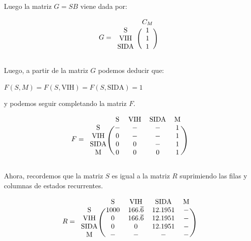\documentclass[11pt]{article}
\begin{document}
Luego la matriz $ G = SB $ viene dada por: 

\begin{equation*}
  G = 
  \begin{blockarray}{cc}
     & C_M \\
    \begin{block}{c(c)}
      \text{S}    & 1 \\
      \text{VIH}  & 1 \\
      \text{SIDA} & 1  \\
    \end{block}
  \end{blockarray}
\end{equation*}

Luego, a partir de la matriz $G$ podemos deducir que:

$ F(S, M) = F(S, \text{VIH}) = F(S, \text{SIDA}) = 1 $

y podemos seguir completando la matriz $F$.

\begin{equation*}
  F = 
  \begin{blockarray}{ccccc}
     & \text{S} & \text{VIH} & \text{SIDA} & \text{M} \\
    \begin{block}{c(cccc)}
      \text{S}    & - & - & - & 1 \\
      \text{VIH}  & 0 & - & - & 1 \\
      \text{SIDA} & 0 & 0 & - & 1 \\
      \text{M}    & 0 & 0 & 0 & 1 \\
    \end{block}
  \end{blockarray}
\end{equation*}

Ahora, recordemos que la matriz $S$ es igual a la matriz $R$ suprimiendo las 
filas y columnas de estados recurrentes. 

\begin{equation*}
  R = 
  \begin{blockarray}{ccccc}
     & \text{S} & \text{VIH} & \text{SIDA} & \text{M}\\
    \begin{block}{c(cccc)}
      \text{S}    & 1000 & 166.\overline{6} & 12.1951 & -\\
      \text{VIH}  & 0    & 166.\overline{6} & 12.1951 & -\\
      \text{SIDA} & 0    & 0                & 12.1951 & -\\
      \text{M}    & -    & -                & -       & - \\
    \end{block}
  \end{blockarray}
\end{equation*}
\end{document}
